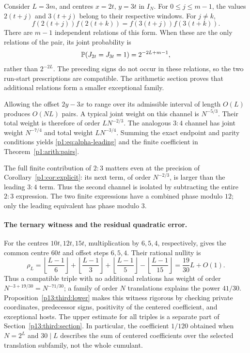 Consider \(L=3m\), and centres \(x=2t\), \(y=3t\) in \(I_N\).
For \(0\le j\le m-1\), the values \(2(t+j)\) and \(3(t+j)\)
belong to their respective windows. For \(j\ne k\),
\[
 f(2(t+j))f(2(t+k))
       =f(3(t+j))f(3(t+k)).
\]
There are \(m-1\) independent relations of this form. When these
are the only relations of the pair, its joint probability is
\[
 \P(J_{2t}=J_{3t}=1)=2^{-2L+m-1},
\]
rather than \(2^{-2L}\). The preceding signs do not occur in these
relations, so the two run-start prescriptions are compatible.
The arithmetic section proves that additional relations form a
smaller exceptional family.

Allowing the offset \(2y-3x\) to range over its admissible interval
of length \(O(L)\) produces \(O(NL)\) pairs. A typical joint weight
on this channel is \(N^{-5/3}\). Their total weight is therefore
of order \(L N^{-2/3}\). The analogous \(3:4\) channel has joint
weight \(N^{-7/4}\) and total weight \(L N^{-3/4}\).
Summing the exact endpoint and parity conditions yields
\eqref{p1:eq:alpha-leading} and the finite coefficient in
Theorem~\ref{p1:arith:pairs}.

The full finite contribution of \(2:3\) matters even at the precision
of Corollary~\ref{p1:cor:explicit}: its next term, of order \(N^{-2/3}\),
is larger than the leading \(3:4\) term. Thus the second channel
is isolated by subtracting the entire \(2:3\) expression.
The two finite expressions have a combined phase modulo \(12\);
only the leading equivalent has phase modulo \(3\).

\paragraph{The ternary witness and the residual quadratic error.}
For the centres \(10t,12t,15t\), multiplication by \(6,5,4\),
respectively, gives the common centre \(60t\) and offset steps
\(6,5,4\). Their rational nullity is
\[
 \rho_L=\left\lfloor\frac{L-1}{6}\right\rfloor
       +\left\lfloor\frac{L-1}{3}\right\rfloor
       +\left\lfloor\frac{L-1}{5}\right\rfloor
       -\left\lfloor\frac{L-1}{15}\right\rfloor
       =\frac{19}{30}L+O(1).
\]
Thus a compatible triple with no additional relations has weight
of order \(N^{-3+19/30}=N^{-71/30}\); a family of order \(N\)
translations explains the power \(41/30\).
Proposition~\ref{p13:third:lower} makes this witness rigorous by
checking private coordinates, predecessor signs, positivity of the
centered coefficient, and exceptional hosts. The upper estimate for
all triples is a separate part of Section~\ref{p13:third:section}.
In particular, the coefficient \(1/120\) obtained when \(N=2^L\)
and \(30\mid L\) describes the sum of centered coefficients over
the selected translation subfamily, not the whole cumulant.

